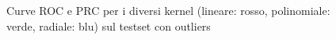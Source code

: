 \newpage

\begin{figure}[H]
    \centering

    \quad
    \label{fig:roc_svm_outliers}
    \caption{Curve ROC e PRC per i diversi kernel (lineare: rosso, polinomiale: verde, radiale: blu) sul testset con outliers}
\end{figure}

